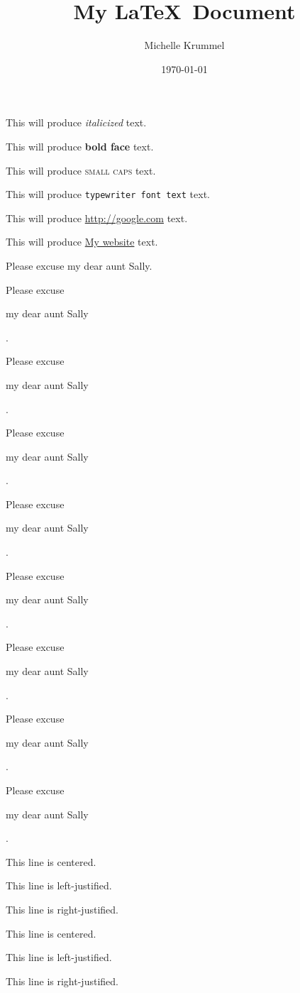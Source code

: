 \documentclass[11pt]{article}
\title{My \LaTeX\ Document}
\author{Michelle Krummel}
\date{\today}
\begin{document}
\tableofcontents
\maketitle
This will produce \textit{italicized} text.

This will produce \textbf{bold face} text.

This will produce \textsc{small caps} text.

This will produce \texttt{typewriter font text} text.

This will produce \url{http://google.com} text.

This will produce \href{http://google.com}{My website} text.

\vspace{1cm}
Please excuse my dear aunt Sally.

Please excuse \begin{large}my dear aunt Sally\end{large}.

Please excuse \begin{Large}my dear aunt Sally\end{Large}.

Please excuse \begin{huge}my dear aunt Sally\end{huge}.

Please excuse \begin{Huge}my dear aunt Sally\end{Huge}.

Please excuse \begin{normalsize}my dear aunt Sally\end{normalsize}.

Please excuse \begin{small}my dear aunt Sally\end{small}.

Please excuse \begin{scriptsize}my dear aunt Sally\end{scriptsize}.

Please excuse \begin{tiny}my dear aunt Sally\end{tiny}.
\vspace{1cm}
\begin{center}
This line is centered.
\end{center}
\vspace{1cm}
\begin{flushleft}
This line is left-justified.
\end{flushleft}
\vspace{1cm}
\begin{flushright}
This line is right-justified.

\centering
This line is centered.

This line is left-justified.

This line is right-justified.
\end{flushright}
\Large
\end{document}
